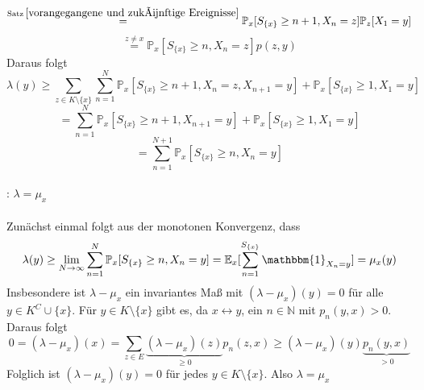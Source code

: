 \begin{itemize}
\begin{equation*}
\end{equation*}
\begin{equation*}
\stackrel{\mathrm{Satz} \:\ref{vorangegangene und zukünftige Ereignisse}}{=} \mathbb{P}_{x}[S_{\lbrace x \rbrace} \geq n+1, X_{n} = z] \mathbb{P}_{z}[ X_{1} = y]
\end{equation*}
\begin{equation*}
\stackrel{z \neq x}{=} \mathbb{P}_{x}[S_{\lbrace x \rbrace} \geq n, X_{n} = z]p(z,y)
\end{equation*}
Daraus folgt
\begin{equation*}
\lambda(y) \geq \sum_{z \in K \setminus \lbrace x \rbrace} \sum_{n=1}^{N} \mathbb{P}_{x}[S_{\lbrace x \rbrace} \geq n+1, X_{n} = z, X_{n+1}=y] + \mathbb{P}_{x}[S_{\lbrace x \rbrace} \geq 1, X_{1} = y]
\end{equation*}
\begin{equation*}
=  \sum_{n=1}^{N} \mathbb{P}_{x}[S_{\lbrace x \rbrace} \geq n+1, X_{n+1}=y] + \mathbb{P}_{x}[S_{\lbrace x \rbrace} \geq 1, X_{1} = y]
\end{equation*}
\begin{equation*}
= \sum_{n=1}^{N+1} \mathbb{P}_{x}[S_{\lbrace x \rbrace} \geq n, X_{n}=y]
\end{equation*}
\\
: $\lambda = \mu_{x}$
\\
\\
Zunächst einmal folgt aus der monotonen Konvergenz, dass 
\begin{equation*}
\lambda(y) \geq \lim_{N \to \infty} \sum_{n=1}^{N} \mathbb{P}_{x}[S_{\lbrace x \rbrace} \geq n, X_{n}=y] = \mathbb{E}_{x}[\sum_{n=1}^{S_{\lbrace x \rbrace}}  \mathbbm{1}_{X_{n} = y}] = \mu_{x}(y)
\end{equation*}
Insbesondere ist $\lambda - \mu_{x}$ ein invariantes Maß mit $(\lambda - \mu_{x})(y)=0$ für alle $y \in K^{C} \cup \lbrace x \rbrace$.
Für $y \in K \setminus \lbrace x \rbrace$ gibt es, da $x \leftrightarrow y$, ein $n \in \mathbb{N}$ mit $p_{n}(y,x)>0$. Daraus folgt
\begin{equation*}
0 = (\lambda - \mu_{x})(x) = \sum_{z \in E} \underbrace{(\lambda - \mu_{x})(z)}_{\geq 0}p_{n}(z,x) \geq (\lambda - \mu_{x})(y)\underbrace{p_{n}(y,x)}_{>0}
\end{equation*}
Folglich ist $ (\lambda - \mu_{x})(y)=0$ für jedes $y \in K \setminus \lbrace x \rbrace$. Also $\lambda = \mu_{x}$ 
\end{itemize}
